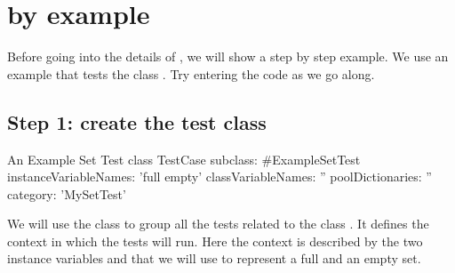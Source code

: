 \documentclass[a4paper,10pt,twoside]{book}
\begin{document}



\section{\sunit by example}

Before going into the details of \SUnit, we will show a step by step
example.  We use an example that tests the class .  Try
entering the code as we go along.
\subsection{Step 1: create the test class}


\begin{classdef}[exampleSetTest]{An Example Set Test class}
TestCase subclass: #ExampleSetTest
	instanceVariableNames: 'full empty'
	classVariableNames: ''
	poolDictionaries: ''
	category: 'MySetTest'
\end{classdef}


We will use the class  to group all the tests related to
the class .  It defines the context in which the tests
will run.  Here the context is described by
the two instance variables  and 
that we will use to represent a full and an empty set.
\end{document}
